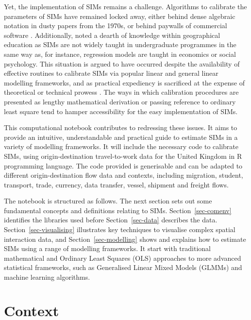 \documentclass[
  a4paper, 
  twoside,
  final
]{article}
\newcounter{code}
\begin{document}
Yet, the implementation of SIMs remains a challenge. Algorithms to
calibrate the parameters of SIMs have remained locked away, either
behind dense algebraic notation in dusty papers from the 1970s, or
behind paywalls of commercial software \citep{rowe2024}. Additionally,
\citet{rowe2024} noted a dearth of knowledge within geographical
education as SIMs are not widely taught in undergraduate programmes in
the same way as, for instance, regression models are taught in economics
or social psychology. This situation is argued to have occurred despite
the availability of effective routines to calibrate SIMs via popular
linear and general linear modelling frameworks, and as practical
expediency is sacrificed at the expense of theoretical or technical
prowess \citep{rowe2024}. The ways in which calibration procedures are
presented as lengthy mathematical derivation or passing reference to
ordinary least square tend to hamper accessibility for the easy
implementation of SIMs.

This computational notebook contributes to redressing these issues. It
aims to provide an intuitive, understandable and practical guide to
estimate SIMs in a variety of modelling frameworks. It will include the
necessary code to calibrate SIMs, using origin-destination
travel-to-work data for the United Kingdom in R programming language.
The code provided is generisable and can be adapted to different
origin-destination flow data and contexts, including migration, student,
transport, trade, currency, data transfer, vessel, shipment and freight
flows.

The notebook is structured as follows. The next section sets out some
fundamental concepts and definitions relating to SIMs.
Section~\ref{sec-comenv} identifies the libraries used before
Section~\ref{sec-data} describes the data. Section~\ref{sec-visualising}
illustrates key techniques to visualise complex spatial interaction
data, and Section~\ref{sec-modelling} shows and explains how to estimate
SIMs using a range of modelling frameworks. It start with traditional
mathematical and Ordinary Least Squares (OLS) approaches to more
advanced statistical frameworks, such as Generalised Linear Mixed Models
(GLMMs) and machine learning algorithms.

\section{Context}\label{context}
\end{document}
